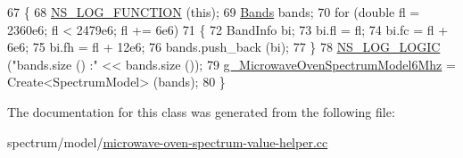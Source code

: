 \begin{DoxyCode}
67   \{
68     \hyperlink{log-macros-disabled_8h_a90b90d5bad1f39cb1b64923ea94c0761}{NS\_LOG\_FUNCTION} (\textcolor{keyword}{this});
69     \hyperlink{namespacens3_a46ac9188e5cf43bd5292f7b67451246e}{Bands} bands;
70     \textcolor{keywordflow}{for} (\textcolor{keywordtype}{double} fl = 2360e6; fl < 2479e6; fl += 6e6)
71       \{
72         BandInfo bi;
73         bi.fl = fl;
74         bi.fc = fl + 6e6;
75         bi.fh = fl + 12e6;
76         bands.push\_back (bi);
77       \}
78     \hyperlink{group__logging_ga88acd260151caf2db9c0fc84997f45ce}{NS\_LOG\_LOGIC} (\textcolor{stringliteral}{"bands.size () :"} << bands.size ());
79     \hyperlink{namespacens3_a6b509b98b71ad13653641d61a3df30c6}{g\_MicrowaveOvenSpectrumModel6Mhz} = Create<SpectrumModel> (bands);
80   \}
\end{DoxyCode}


The documentation for this class was generated from the following file\+:\begin{DoxyCompactItemize}
\item 
spectrum/model/\hyperlink{microwave-oven-spectrum-value-helper_8cc}{microwave-\/oven-\/spectrum-\/value-\/helper.\+cc}\end{DoxyCompactItemize}
